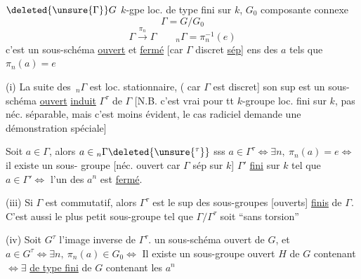 $\deleted{\unsure{\Gamma}}G$ \quad $k$-gpe loc. de type fini sur $k$,
$G_0$ \quad composante connexe
\[
\Gamma=G/G_0
\]
\[
\Gamma\xrightarrow{\pi_n}\Gamma\qquad {}_n\Gamma=\pi_n^{-1}(e)
\]
c'est un sous-schéma \uline{ouvert} et \uline{fermé} [car $\Gamma$
discret \uline{sép}] ens des $a$ tels que $\pi_n(a)=e$

(i) La suite des $\,{}_n\Gamma$ est loc. stationnaire,  (
car $\Gamma$ est discret]  son
sup est un sous-schéma \uline{ouvert} \uline{induit} $\Gamma^\tau$
de $\Gamma$ [N.B. c'est vrai pour tt $k$-groupe
loc. fini sur $k$, pas néc. séparable, mais
c'est moins évident, le cas radiciel
demande une démonstration spéciale]

 Soit $a\in\Gamma$, alors $a\in{}_n\Gamma\deleted{\unsure{^\tau}}$ sss 
$a\in\Gamma^\tau\Longleftrightarrow\exists n,\ \pi_n(a)=e\Longleftrightarrow$ il existe un sous-
 groupe  [néc. ouvert car $\Gamma$ sép sur $k$]
$\Gamma'$ \uline{fini} sur $k$ tel que $a\in\Gamma'\Longleftrightarrow$
l'un des $a^n$ est \uline{fermé}.

(iii) Si $\Gamma$ est commutatif, alors $\Gamma^\tau$ est le
sup des sous-groupes [ouverts] \uline{finis}
de $\Gamma$. C'est aussi le plus petit sous-groupe
tel que $\Gamma/\Gamma^\tau$ soit ``sans torsion''

(iv) Soit $G^\tau$ l'image inverse de $\Gamma^\tau$. 
un sous-schéma ouvert de $G$, et
$a\in G^\tau\Longleftrightarrow\exists n,\ \pi_n(a)\in G_0\Longleftrightarrow$ Il existe
un sous-groupe ouvert $H$ de $G$ contenant  
$\Longleftrightarrow\exists$  \uline{de type fini} de $G$ contenant les $a^n$
